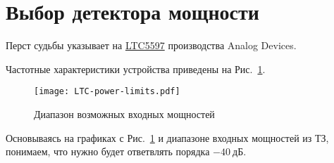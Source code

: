 \section{Выбор детектора мощности}

Перст судьбы указывает на \href{https://www.analog.com/en/products/ltc5597.html}{LTC5597} производства Analog Devices. 

Частотные характеристики устройства приведены на Рис.~\ref{fig:LTC_response}.

\begin{figure}[H]
		\centering
		\texttt{[image: LTC-power-limits.pdf]}
	\caption{Диапазон возможных входных мощностей}%
	\label{fig:LTC_response}
\end{figure}

Основываясь на графиках с  Рис.~\ref{fig:LTC_response} и диапазоне входных мощностей из ТЗ, понимаем, 
что нужно будет ответвлять порядка $-40~\text{дБ}$. 


